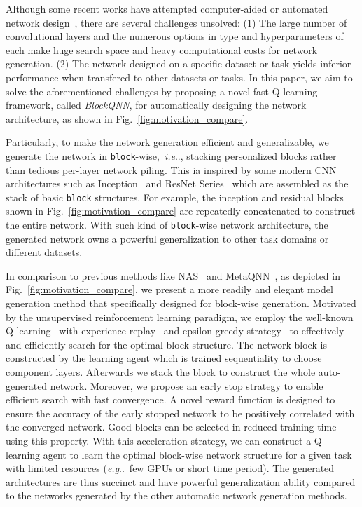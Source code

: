 \documentclass[10pt,journal,compsoc]{IEEEtran}
\makeatletter
\DeclareRobustCommand\onedot{\futurelet\@let@token\@onedot}
\def\@onedot{\ifx\@let@token.\else.\null\fi\xspace}
\def\eg{\emph{e.g}\onedot} \def\Eg{\emph{E.g}\onedot}
\def\ie{\emph{i.e}\onedot} \def\Ie{\emph{I.e}\onedot}
\makeatother
\begin{document}
Although some recent works have attempted computer-aided or automated network design~\cite{baker2016designing,zoph2016neural}, there are several challenges unsolved: 
(1) The large number of convolutional layers and the numerous options in type and hyperparameters of each make huge search space and heavy computational costs for network generation.
(2) The network designed on a specific dataset or task yields inferior performance when transfered to other datasets or tasks.
In this paper, we aim to solve the aforementioned challenges by proposing a novel fast Q-learning framework, called \textit{BlockQNN}, for automatically designing the network architecture, as shown in Fig.~\ref{fig:motivation_compare}.


Particularly, to make the network generation efficient and generalizable, we generate the network in \texttt{block}-wise,~\ie, stacking personalized blocks rather than tedious per-layer network piling.
This ia inspired by some modern CNN architectures such as Inception~\cite{szegedy2015going,ioffe2015batch,szegedy2015rethinking} and ResNet Series~\cite{he2015deep,he2016identity} which are assembled as the stack of basic \texttt{block} structures.
For example, the inception and residual blocks shown in Fig.~\ref{fig:motivation_compare} are repeatedly concatenated to construct the entire network.
With such kind of \texttt{block}-wise network architecture, the generated network owns a powerful generalization to other task domains or different datasets. 





In comparison to previous methods like NAS~\cite{zoph2016neural} and MetaQNN~\cite{baker2016designing}, as depicted in Fig.~\ref{fig:motivation_compare}, we present a more readily and elegant model generation method that specifically designed for block-wise generation.
Motivated by the unsupervised reinforcement learning paradigm, we employ the well-known Q-learning~\cite{watkins1989learning} with experience replay~\cite{lin1993reinforcement} and epsilon-greedy strategy~\cite{mnih2015human} to effectively and efficiently search for the optimal block structure.
The network block is constructed by the learning agent which is trained sequentiality to choose component layers. Afterwards we stack the block to construct the whole auto-generated network.
Moreover, we propose an early stop strategy to enable efficient search with fast convergence. A novel reward function is designed to ensure the accuracy of the early stopped network to be positively correlated with the converged network. Good blocks can be selected in reduced training time using this property.
With this acceleration strategy, we can construct a Q-learning agent to learn the optimal block-wise network structure for a given task with limited resources (\eg~few GPUs or short time period).
The generated architectures are thus succinct and have powerful generalization ability compared to the networks generated by the other automatic network generation methods.
\end{document}
